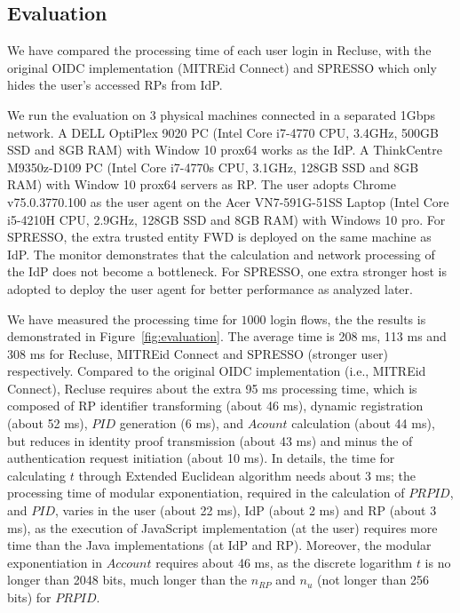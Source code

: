 \subsection{Evaluation}
\label{sec:evaluation}
We have compared the processing time of each user login in Recluse, with the original OIDC implementation (MITREid Connect) and SPRESSO which only hides the user's accessed RPs from IdP.

 We run the evaluation on 3 physical machines connected in a separated 1Gbps network. A DELL OptiPlex 9020 PC (Intel Core i7-4770 CPU, 3.4GHz, 500GB SSD and 8GB RAM) with Window 10 prox64 works as the IdP. A ThinkCentre M9350z-D109 PC (Intel Core i7-4770s CPU, 3.1GHz, 128GB SSD and 8GB RAM) with  Window 10 prox64 servers as RP. The user adopts Chrome v75.0.3770.100 as the user agent on the Acer VN7-591G-51SS Laptop (Intel Core i5-4210H CPU, 2.9GHz, 128GB SSD and 8GB RAM) with  Windows 10 pro. For SPRESSO, the extra trusted entity FWD is deployed on the same machine as IdP. The monitor demonstrates that  the calculation and network processing of the IdP does not become a bottleneck. For SPRESSO, one extra stronger host is adopted to deploy the user agent for better performance as analyzed later.

 We have measured the processing time for $1000$ login flows, the the results is demonstrated in Figure~\ref{fig:evaluation}. The average time is 208 ms, 113 ms and 308 ms for Recluse, MITREid Connect and SPRESSO (stronger user) respectively. Compared to the original OIDC implementation (i.e., MITREid Connect), Recluse requires about the extra 95 ms processing time, which is composed of RP identifier transforming (about 46 ms), dynamic registration (about 52 ms), $PID$ generation (6 ms), and $Acount$ calculation (about 44 ms), but reduces in identity proof transmission (about 43 ms) and minus the of authentication request initiation (about 10 ms). In details, the time for calculating $t$ through Extended Euclidean algorithm needs about 3 ms; the processing time of modular exponentiation, required in the calculation of $PRPID$, and $PID$, varies in the user (about 22 ms), IdP (about 2 ms) and RP (about 3 ms), as the execution of  JavaScript implementation (at the user) requires more time than the Java implementations (at IdP and RP). Moreover, the modular exponentiation in $Account$ requires about 46 ms, as the discrete logarithm $t$ is no longer than 2048 bits, much longer than the $n_{RP}$ and $n_{u}$ (not longer than 256 bits) for $PRPID$.

